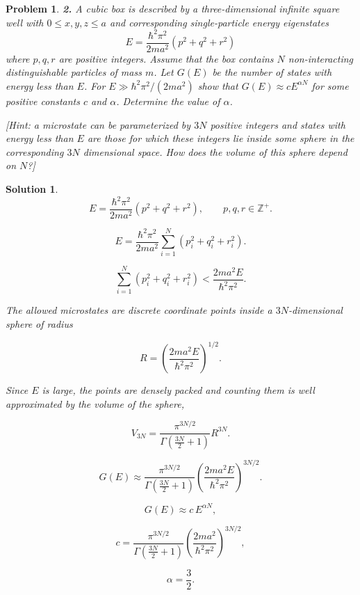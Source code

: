 \documentclass[11pt]{article}
\newtheorem*{problem}{Problem}
\newtheorem*{solution}{Solution}
\begin{document}
\begin{problem}
\textbf{2.} A cubic box is described by a three-dimensional infinite square well with $0\le x,y,z\le a$
and corresponding single-particle energy eigenstates
\[
E=\frac{\hbar^2\pi^2}{2ma^2}(p^2+q^2+r^2)
\]
where $p,q,r$ are positive integers. Assume that the box contains $N$ non-interacting
distinguishable particles of mass $m$. Let $G(E)$ be the number of states with energy less
than $E$. For $E \gg \hbar^2\pi^2/(2ma^2)$ show that $G(E) \approx cE^{\alpha N}$ for some
positive constants $c$ and $\alpha$. Determine the value of $\alpha$.

[\textit{Hint}: a microstate can be parameterized by $3N$ positive integers and states with
energy less than $E$ are those for which these integers lie inside some sphere in the
corresponding $3N$ dimensional space. How does the volume of this sphere depend on $N$?]
\end{problem}

\begin{solution}
\[
E=\frac{\hbar^2\pi^2}{2ma^2}(p^2+q^2+r^2),
\qquad p,q,r\in\mathbb{Z}^+.
\]

\[
E=\frac{\hbar^2\pi^2}{2ma^2}\sum_{i=1}^{N}(p_i^2+q_i^2+r_i^2).
\]

\[
\sum_{i=1}^{N}(p_i^2+q_i^2+r_i^2)
<
\frac{2ma^2E}{\hbar^2\pi^2}.
\]

The allowed microstates are discrete coordinate points inside a $3N$-dimensional sphere
of radius

\[
R=\left(\frac{2ma^2E}{\hbar^2\pi^2}\right)^{1/2}.
\]

Since $E$ is large, the points are densely packed and counting them is well approximated
by the volume of the sphere,

\[
V_{3N}
=
\frac{\pi^{3N/2}}
{\Gamma\!\left(\frac{3N}{2}+1\right)}
R^{3N}.
\]

\[
G(E)
\approx
\frac{\pi^{3N/2}}
{\Gamma\!\left(\frac{3N}{2}+1\right)}
\left(\frac{2ma^2E}{\hbar^2\pi^2}\right)^{3N/2}.
\]

\[
G(E)\approx c\,E^{\alpha N},
\]

\[
c=
\frac{\pi^{3N/2}}
{\Gamma\!\left(\frac{3N}{2}+1\right)}
\left(\frac{2ma^2}{\hbar^2\pi^2}\right)^{3N/2},
\]

\[
\boxed{\alpha=\frac{3}{2}.}
\]
\end{solution}
\end{document}
